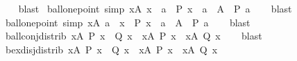\begin{isabellebody}
%
\isadelimproof
\ \ %
\endisadelimproof
%
\isatagproof
{}\isamarkupfalse%
\ blast%
\endisatagproof
{\isafoldproof}%
%
\isadelimproof
\isanewline
%
\endisadelimproof
\isanewline
{}\isamarkupfalse%
\ ball{\isacharunderscore}{\kern0pt}one{\isacharunderscore}{\kern0pt}point{}\ {\isacharbrackleft}{\kern0pt}simp{\isacharbrackright}{\kern0pt}{\isacharcolon}{\kern0pt}\ {\isachardoublequoteopen}{\isacharparenleft}{\kern0pt}{\isasymforall}x{\isasymin}A{\isachardot}{\kern0pt}\ x\ {\isacharequal}{\kern0pt}\ a\ {\isasymlongrightarrow}\ P\ x{\isacharparenright}{\kern0pt}\ {\isasymlongleftrightarrow}\ {\isacharparenleft}{\kern0pt}a\ {\isasymin}\ A\ {\isasymlongrightarrow}\ P\ a{\isacharparenright}{\kern0pt}{\isachardoublequoteclose}\isanewline
%
\isadelimproof
\ \ %
\endisadelimproof
%
\isatagproof
{}\isamarkupfalse%
\ blast%
\endisatagproof
{\isafoldproof}%
%
\isadelimproof
\isanewline
%
\endisadelimproof
\isanewline
{}\isamarkupfalse%
\ ball{\isacharunderscore}{\kern0pt}one{\isacharunderscore}{\kern0pt}point{}\ {\isacharbrackleft}{\kern0pt}simp{\isacharbrackright}{\kern0pt}{\isacharcolon}{\kern0pt}\ {\isachardoublequoteopen}{\isacharparenleft}{\kern0pt}{\isasymforall}x{\isasymin}A{\isachardot}{\kern0pt}\ a\ {\isacharequal}{\kern0pt}\ x\ {\isasymlongrightarrow}\ P\ x{\isacharparenright}{\kern0pt}\ {\isasymlongleftrightarrow}\ {\isacharparenleft}{\kern0pt}a\ {\isasymin}\ A\ {\isasymlongrightarrow}\ P\ a{\isacharparenright}{\kern0pt}{\isachardoublequoteclose}\isanewline
%
\isadelimproof
\ \ %
\endisadelimproof
%
\isatagproof
{}\isamarkupfalse%
\ blast%
\endisatagproof
{\isafoldproof}%
%
\isadelimproof
\isanewline
%
\endisadelimproof
\isanewline
{}\isamarkupfalse%
\ ball{\isacharunderscore}{\kern0pt}conj{\isacharunderscore}{\kern0pt}distrib{\isacharcolon}{\kern0pt}\ {\isachardoublequoteopen}{\isacharparenleft}{\kern0pt}{\isasymforall}x{\isasymin}A{\isachardot}{\kern0pt}\ P\ x\ {\isasymand}\ Q\ x{\isacharparenright}{\kern0pt}\ {\isasymlongleftrightarrow}\ {\isacharparenleft}{\kern0pt}{\isasymforall}x{\isasymin}A{\isachardot}{\kern0pt}\ P\ x{\isacharparenright}{\kern0pt}\ {\isasymand}\ {\isacharparenleft}{\kern0pt}{\isasymforall}x{\isasymin}A{\isachardot}{\kern0pt}\ Q\ x{\isacharparenright}{\kern0pt}{\isachardoublequoteclose}\isanewline
%
\isadelimproof
\ \ %
\endisadelimproof
%
\isatagproof
{}\isamarkupfalse%
\ blast%
\endisatagproof
{\isafoldproof}%
%
\isadelimproof
\isanewline
%
\endisadelimproof
\isanewline
{}\isamarkupfalse%
\ bex{\isacharunderscore}{\kern0pt}disj{\isacharunderscore}{\kern0pt}distrib{\isacharcolon}{\kern0pt}\ {\isachardoublequoteopen}{\isacharparenleft}{\kern0pt}{\isasymexists}x{\isasymin}A{\isachardot}{\kern0pt}\ P\ x\ {\isasymor}\ Q\ x{\isacharparenright}{\kern0pt}\ {\isasymlongleftrightarrow}\ {\isacharparenleft}{\kern0pt}{\isasymexists}x{\isasymin}A{\isachardot}{\kern0pt}\ P\ x{\isacharparenright}{\kern0pt}\ {\isasymor}\ {\isacharparenleft}{\kern0pt}{\isasymexists}x{\isasymin}A{\isachardot}{\kern0pt}\ Q\ x{\isacharparenright}{\kern0pt}{\isachardoublequoteclose}\isanewline

\end{isabellebody}
